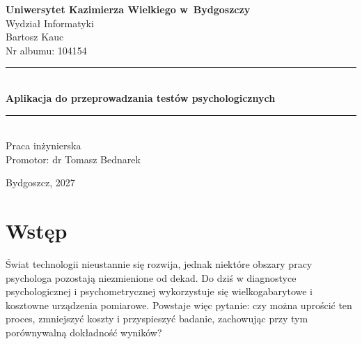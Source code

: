 \documentclass[12pt, a4paper, oneside]{report}
\begin{document}
\begin{titlepage}
	\centering

	\vspace*{1cm}

	{\large\textbf{Uniwersytet Kazimierza Wielkiego w~Bydgoszczy}}\\[0.3cm]
	{\large Wydział Informatyki}\\[2cm]
	{\large Bartosz Kauc}\\[0.3cm]
	{\large Nr albumu: 104154}\\[2cm]

	\rule{\textwidth}{0.4pt}\\[0.6cm]

	{\LARGE\bfseries
		Aplikacja do przeprowadzania testów psychologicznych
	}\\[0.4cm]

	\rule{\textwidth}{0.4pt}\\[2cm]

	{\large Praca inżynierska}\\[1cm]

	{\large Promotor: dr Tomasz Bednarek}\\[2cm]

	\vfill

	{\large Bydgoszcz, 2027}

\end{titlepage}

\tableofcontents
\newpage



\chapter*{Wstęp}
\label{chap:wstep}

Świat technologii nieustannie się rozwija, jednak niektóre obszary pracy psychologa pozostają niezmienione od dekad. Do dziś w diagnostyce psychologicznej i psychometrycznej wykorzystuje się wielkogabarytowe i kosztowne urządzenia pomiarowe. Powstaje więc pytanie: czy można uprościć ten proces, zmniejszyć koszty i przyspieszyć badanie, zachowując przy tym porównywalną dokładność wyników?
\end{document}

